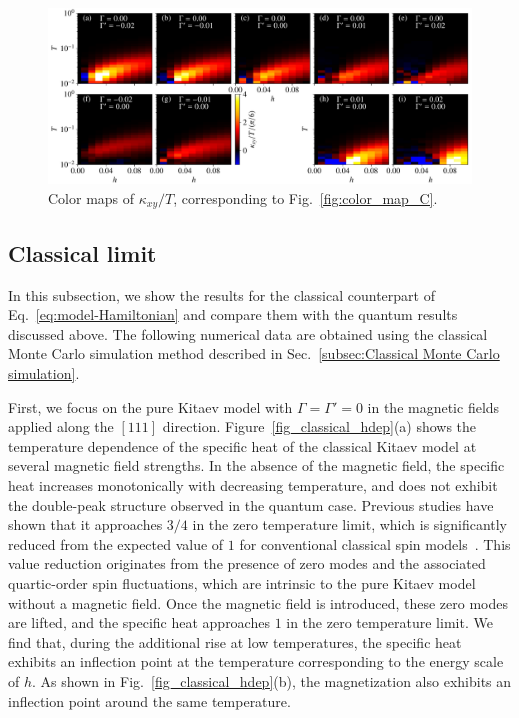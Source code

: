 \documentclass[twocolumn,superscriptaddress,showpacs, longbibliography, aps, prx]{revtex4-2}
\begin{document}
\begin{figure}[htb]
  \begin{center}
    \includegraphics[width=\linewidth]{Data_for_figs/plot/fig-16-XTRG-cmap.pdf}
  \end{center}
  \caption{
Color maps of $\kappa_{xy}/T$, corresponding to Fig.~\ref{fig:color_map_C}.} 
  \label{fig:color_map_all}
\end{figure}

\subsection{Classical limit}
\label{sec:classicalMC}

In this subsection, we show the results for the classical counterpart of Eq.~\eqref{eq:model-Hamiltonian} and compare them with the quantum results discussed above.
The following numerical data are obtained using the classical Monte Carlo simulation method described in Sec.~\ref{subsec:Classical Monte Carlo simulation}. 

First, we focus on the pure Kitaev model with $\Gamma=\Gamma'=0$ in the magnetic fields applied along the $[111]$ direction.
Figure~\ref{fig_classical_hdep}(a) shows the temperature dependence of the specific heat of the classical Kitaev model at several magnetic field strengths. 
In the absence of the magnetic field, the specific heat increases monotonically with decreasing temperature, and does not exhibit the double-peak structure observed in the quantum case. 
Previous studies have shown that it approaches $3/4$ in the zero temperature limit, which is significantly reduced from the expected value of $1$ for conventional classical spin models~\cite{Sela2014,Suzuki2018_2}.
This value reduction originates from the presence of zero modes and the associated quartic-order spin fluctuations, which are intrinsic to the pure Kitaev model without a magnetic field.
Once the magnetic field is introduced, these zero modes are lifted, and the specific heat approaches $1$ in the zero temperature limit. 
We find that, during the additional rise at low temperatures, the specific heat exhibits an inflection point at the temperature corresponding to the energy scale of $h$. 
As shown in Fig.~\ref{fig_classical_hdep}(b), the magnetization also exhibits an inflection point around the same temperature.
\end{document}
